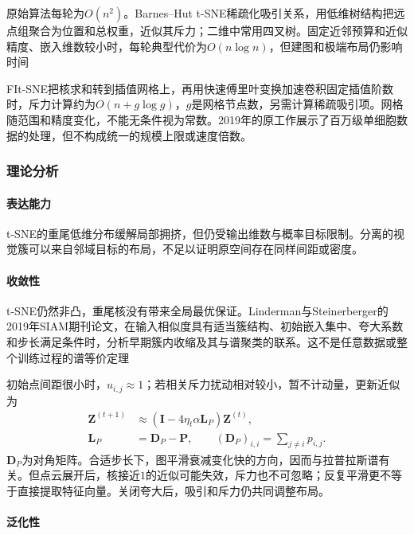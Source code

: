 原始算法每轮为$O(n^2)$。Barnes--Hut t-SNE稀疏化吸引关系，用低维树结构把远点组聚合为位置和总权重，近似其斥力；二维中常用四叉树。固定近邻预算和近似精度、嵌入维数较小时，每轮典型代价为$O(n\log n)$，但建图和极端布局仍影响时间

FIt-SNE把核求和转到插值网格上，再用快速傅里叶变换加速卷积固定插值阶数时，斥力计算约为$O(n+g\log g)$，$g$是网格节点数，另需计算稀疏吸引项。网格随范围和精度变化，不能无条件视为常数。2019年的原工作展示了百万级单细胞数据的处理，但不构成统一的规模上限或速度倍数。

\subsubsection{理论分析}
\label{sec:dim-tsne-theory}

\paragraph{表达能力}
t-SNE的重尾低维分布缓解局部拥挤，但仍受输出维数与概率目标限制。分离的视觉簇可以来自邻域目标的布局，不足以证明原空间存在同样间距或密度。

\paragraph{收敛性}

t-SNE仍然非凸，重尾核没有带来全局最优保证。Linderman与Steinerberger的2019年SIAM期刊论文，在输入相似度具有适当簇结构、初始嵌入集中、夸大系数和步长满足条件时，分析早期簇内收缩及其与谱聚类的联系。这不是任意数据或整个训练过程的谱等价定理

初始点间距很小时，$u_{i,j}\approx1$；若相关斥力扰动相对较小，暂不计动量，更新近似为
\begin{equation}
  \label{eq:dim-tsne-spectral-approximation}
  \begin{aligned}
    \bm{Z}^{(t+1)}
      &\approx(\bm{I}-4\eta_t\alpha\bm{L}_{P})\bm{Z}^{(t)},\\
    \bm{L}_{P}&=\bm{D}_{P}-\bm{P},\qquad
    (\bm{D}_{P})_{i,i}=\sum_{j\ne i}p_{i,j}.
  \end{aligned}
\end{equation}
$\bm{D}_{P}$为对角矩阵。合适步长下，图平滑衰减变化快的方向，因而与拉普拉斯谱有关。但点云展开后，核接近$1$的近似可能失效，斥力也不可忽略；反复平滑更不等于直接提取特征向量。关闭夸大后，吸引和斥力仍共同调整布局。

\paragraph{泛化性}

